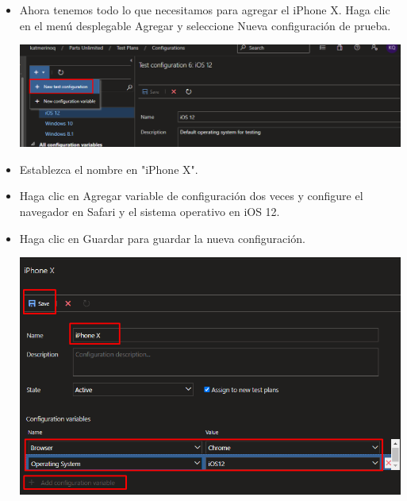 \begin{itemize}
\item Ahora tenemos todo lo que necesitamos para agregar el iPhone X. Haga clic en el menú desplegable Agregar y seleccione Nueva configuración de prueba.
\begin{center}
\includegraphics[width=\columnwidth]{images/11}\newline
\end{center}

\item Establezca el nombre en "iPhone X".
\item Haga clic en Agregar variable de configuración dos veces y configure el navegador en Safari y el sistema operativo en iOS 12.
\item Haga clic en Guardar para guardar la nueva configuración.
\begin{center}
\includegraphics[width=\columnwidth]{images/46}\newline
\end{center}


\end{itemize}
